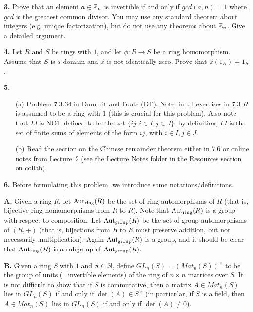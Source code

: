 \documentclass[12pt]{amsart}
\begin{document}
\skv

{\bf 3.} Prove that an element $\bar a\in{\mathbb Z}_n$ is invertible if and only if $gcd(a,n)=1$
where $gcd$ is the greatest common divisor. You may use any standard theorem about integers
(e.g. unique factorization), but do not use any theorems about ${\mathbb Z}_n$. Give a detailed argument.
\skv

{\bf 4.} Let $R$ and $S$ be rings with $1$, and let $\phi: R\to S$ be a ring homomorphism. Assume that
$S$ is a domain and $\phi$ is not identically zero. Prove that $\phi(1_R)=1_S$.
\skv

{\bf 5.} 
\begin{itemize}
\item[(a)] Problem 7.3.34 in Dummit and Foote (DF). Note: in all exercises in 7.3 $R$ is assumed to be a ring  
with $1$ (this is crucial for this problem). Also note that $IJ$ is NOT defined to be the set 
$\{ij: i\in I, j\in J\}$;  by definition, $IJ$ is the set of finite sums of elements of the form 
$ij$, with $i\in I, j\in J$.  

\item[(b)] Read the section on the Chinese remainder theorem either in 7.6 or online notes from Lecture~2 (see the Lecture Notes folder in the Resources section on collab).
\end{itemize}

{\bf 6.} Before formulating this problem, we introduce some notations/definitions.

{\bf A.} Given a ring $R$, let ${\rm Aut}_{\rm ring}(R)$ be the set of ring automorphisms of $R$ (that is, bijective ring homomorphisms from $R$ to $R$). Note that ${\rm Aut}_{\rm ring}(R)$ is a group with respect to composition. Let ${\rm Aut}_{\rm group}(R)$ be the set of group automorphisms of $(R,+)$ (that is, bijections from $R$ to $R$ must preserve addition, but not necessarily multiplication).
Again ${\rm Aut}_{\rm group}(R)$ is a group, and it should be clear that ${\rm Aut}_{\rm ring}(R)$ is a subgroup of ${\rm Aut}_{\rm group}(R)$.
\skv

{\bf B.} Given a ring $S$ with $1$ and $n\in{\mathbb N}$, define $GL_n(S)=(Mat_n(S))^{\times}$ to be the group of units (=invertible elements) of the ring of $n\times n$ matrices over $S$. It is not difficult to show that if $S$ is commutative, then a matrix $A\in Mat_n(S)$ lies
in $GL_n(S)$ if and only if $\det(A)\in S^{\times}$ (in particular, if $S$ is a field, then $A\in Mat_n(S)$ lies
in $GL_n(S)$ if and only if $\det(A)\neq 0$).
\skv
\end{document}
